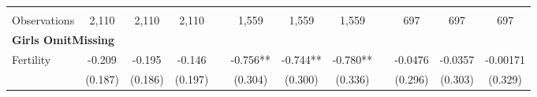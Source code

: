 \begin{landscape}
\begin{table}[htpb!]
\begin{center}
\begin{tabular}{lcccp{2mm}cccp{2mm}ccc}
\begin{footnotesize}\end{footnotesize}&\begin{footnotesize}\end{footnotesize}&\begin{footnotesize}\end{footnotesize}&\begin{footnotesize}\end{footnotesize}&\begin{footnotesize}\end{footnotesize}&\begin{footnotesize}\end{footnotesize}&\begin{footnotesize}\end{footnotesize}&\begin{footnotesize}\end{footnotesize}&\begin{footnotesize}\end{footnotesize}&\begin{footnotesize}\end{footnotesize}&\begin{footnotesize}\end{footnotesize}&\begin{footnotesize}\end{footnotesize}\\Observations&2,110&2,110&2,110&&1,559&1,559&1,559&&697&697&697\\
\multicolumn{12}{l}{\textbf{Girls OmitMissing}}\\ 
Fertility&-0.209&-0.195&-0.146&&-0.756**&-0.744**&-0.780**&&-0.0476&-0.0357&-0.00171\\
&(0.187)&(0.186)&(0.197)&&(0.304)&(0.300)&(0.336)&&(0.296)&(0.303)&(0.329)\\

\end{tabular}
\end{center}
\end{table}
\end{landscape}
